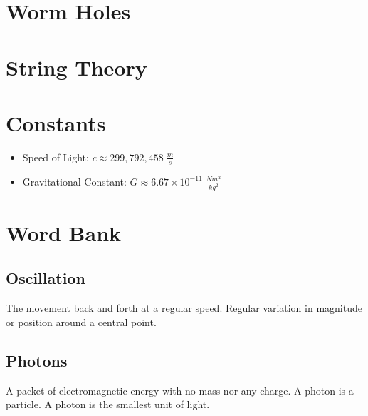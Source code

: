 \documentclass{article}
\begin{document}
\section{Worm Holes}



\section{String Theory}



\section{Constants}\label{sec:constants}
\begin{itemize}
    \item Speed of Light: $c \approx 299,792,458\;\frac{m}{s}$
    \item Gravitational Constant: $G \approx 6.67 \times 10^{-11}\;\frac{Nm^2}{kg^2}$
\end{itemize}

\section{Word Bank}
\subsection{Oscillation}\label{sec:oscillation}
The movement back and forth at a regular speed. Regular variation in magnitude or position around a central point.

\subsection{Photons}\label{sec:photons}
A packet of electromagnetic energy with no mass nor any charge. A photon is a particle. A photon is the smallest unit of light.
\end{document}
